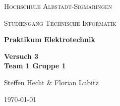     \begin{titlepage}
        \centering
        {\scshape\LARGE Hochschule Albstadt-Sigmaringen \par}
        {\scshape\large Studiengang Technische Informatik \par}
        \vspace{3cm}
        {\LARGE\bfseries Praktikum Elektrotechnik\par}
        \vspace{2cm}
        {\Huge\bfseries Versuch 3 \\ Team 1 Gruppe 1\par}
        \vspace{1cm}
        {\Large Steffen Hecht \& Florian Lubitz\par}
        \vspace{2cm}
        \vfill

        {\large \today\par}
    \end{titlepage}